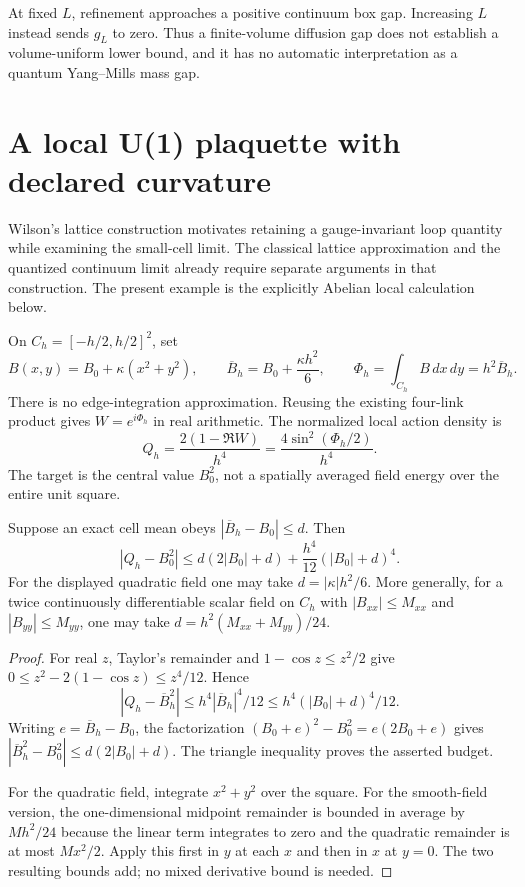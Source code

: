 At fixed $L$, refinement approaches a positive continuum box gap.
Increasing $L$ instead sends $g_L$ to zero. Thus a finite-volume diffusion
gap does not establish a volume-uniform lower bound, and it has no
automatic interpretation as a quantum Yang--Mills mass gap.

\section{A local U(1) plaquette with declared curvature}

Wilson's lattice construction motivates retaining a gauge-invariant loop
quantity while examining the small-cell limit. The classical lattice
approximation and the quantized continuum limit already require separate
arguments in that construction.\cite[Section~III.A]{frWilson1974}
The present example is the explicitly Abelian local calculation below.

On $C_h=[-h/2,h/2]^2$, set
\[
 B(x,y)=B_0+\kappa(x^2+y^2),\qquad
 \overline B_h=B_0+\frac{\kappa h^2}{6},\qquad
 \Phi_h=\int_{C_h}B\,dx\,dy=h^2\overline B_h.
\]
There is no edge-integration approximation. Reusing the existing four-link
product gives $W=e^{i\Phi_h}$ in real arithmetic. The normalized local
action density is
\[
 Q_h=\frac{2(1-\Re W)}{h^4}
     =\frac{4\sin^2(\Phi_h/2)}{h^4}.
\]
The target is the central value $B_0^2$, not a spatially averaged field
energy over the entire unit square.

\begin{proposition}
\label{prop:fr-local-wilson-bound}
Suppose an exact cell mean obeys
$|\overline B_h-B_0|\le d$. Then
\[
 |Q_h-B_0^2|
 \le d(2|B_0|+d)+\frac{h^4}{12}(|B_0|+d)^4.
\]
For the displayed quadratic field one may take
$d=|\kappa|h^2/6$. More generally, for a twice continuously
differentiable scalar field on $C_h$ with
$|B_{xx}|\le M_{xx}$ and $|B_{yy}|\le M_{yy}$, one may take
$d=h^2(M_{xx}+M_{yy})/24$.
\end{proposition}
\begin{proof}
For real $z$, Taylor's remainder and $1-\cos z\le z^2/2$ give
$0\le z^2-2(1-\cos z)\le z^4/12$. Hence
\[
 |Q_h-\overline B_h^2|
 \le h^4|\overline B_h|^4/12
 \le h^4(|B_0|+d)^4/12.
\]
Writing $e=\overline B_h-B_0$, the factorization
$(B_0+e)^2-B_0^2=e(2B_0+e)$ gives
$|\overline B_h^2-B_0^2|\le d(2|B_0|+d)$.
The triangle inequality proves the asserted budget.

For the quadratic field, integrate $x^2+y^2$ over the square.
For the smooth-field version, the one-dimensional midpoint remainder is
bounded in average by $Mh^2/24$ because the linear term integrates to
zero and the quadratic remainder is at most $Mx^2/2$. Apply this
first in $y$ at each $x$ and then in $x$ at $y=0$.
The two resulting bounds add; no mixed derivative bound is needed.
\end{proof}


